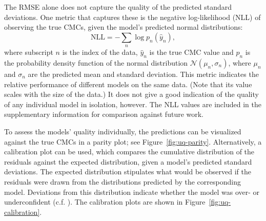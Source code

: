 The RMSE alone does not capture the quality of the predicted standard
deviations. One metric that captures these is the negative log-likelihood (NLL)
of observing the true CMCs, given the model's predicted normal distributions:
\begin{equation}
    \text{NLL} = -\sum_n \log p_n(\hat{y}_n),
\end{equation}
where subscript $n$ is the index of the data, $\hat{y}_n$ is the true CMC value
and $p_n$ is the probability density function of the normal distribution
$\mathcal{N}(\mu_n, \sigma_n)$, where $\mu_n$ and $\sigma_n$ are the predicted
mean and standard deviation. This metric indicates the relative performance of
different models on the same data. (Note that its value scales with the size of
the data.) It does not give a good indication of the quality of any individual
model in isolation, however. The NLL values are included in the supplementary
information for comparison against future work.

To assess the models' quality individually, the predictions can be visualized
against the true CMCs in a parity plot; see Figure~\ref{fig:uq-parity}.
Alternatively, a calibration plot can be used, which compares the cumulative
distribution of the residuals against the expected distribution, given a model's
predicted standard deviations. The expected distribution stipulates what would
be observed if the residuals were drawn from the distributions predicted by the
corresponding model. Deviations from this distribution indicate whether the
model was over- or underconfident (c.f.
\citet{tranMethodsComparingUncertainty2020}). The calibration plots are shown in
Figure~\ref{fig:uq-calibration}.

